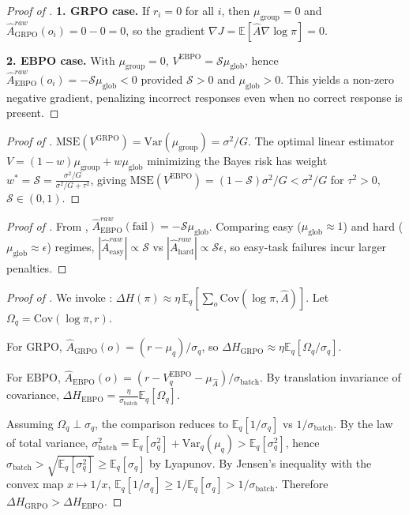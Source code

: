 \documentclass{article}
\theoremstyle{plain}
\theoremstyle{definition}
\theoremstyle{remark}
\begin{document}
\iffalse
\begin{proof}[Proof of ]
\textbf{1. GRPO case.} If $r_i=0$ for all $i$, then $\mu_{\text{group}}=0$ and $\hat{A}^{raw}_{\text{GRPO}}(o_i)=0-0=0$, so the gradient $\nabla J=\mathbb{E}[\hat{A}\nabla\log\pi]=0$.

\textbf{2. EBPO case.} With $\mu_{\text{group}}=0$, $V^{\text{EBPO}}=\mathcal{S}\mu_{\text{glob}}$, hence $\hat{A}^{raw}_{\text{EBPO}}(o_i)=-\mathcal{S}\mu_{\text{glob}}<0$ provided $\mathcal{S}>0$ and $\mu_{\text{glob}}>0$. This yields a non-zero negative gradient, penalizing incorrect responses even when no correct response is present.
\end{proof}

\begin{proof}[Proof of ]
$\text{MSE}(V^{\text{GRPO}})=\text{Var}(\mu_{\text{group}})=\sigma^2/G$. The optimal linear estimator $V=(1-w)\mu_{\text{group}}+w\mu_{\text{glob}}$ minimizing the Bayes risk has weight $w^*=\mathcal{S}=\frac{\sigma^2/G}{\sigma^2/G+\tau^2}$, giving
$\text{MSE}(V^{\text{EBPO}}) = (1-\mathcal{S})\sigma^2/G < \sigma^2/G$ for $\tau^2>0$, $\mathcal{S}\in(0,1)$.
\end{proof}

\begin{proof}[Proof of ]
From , $\hat{A}^{raw}_{\text{EBPO}}(\text{fail})=-\mathcal{S}\mu_{\text{glob}}$. Comparing easy ($\mu_{\text{glob}}\approx 1$) and hard ($\mu_{\text{glob}}\approx \epsilon$) regimes, $|\hat{A}^{raw}_{\text{easy}}|\propto\mathcal{S}$ vs $|\hat{A}^{raw}_{\text{hard}}|\propto\mathcal{S}\epsilon$, so easy-task failures incur larger penalties.
\end{proof}

\begin{proof}[Proof of ]
We invoke \citet{cui2025entropy}: $\Delta H(\pi)\approx\eta\,\mathbb{E}_q[\sum_o\text{Cov}(\log\pi,\hat{A})]$. Let $\Omega_q=\text{Cov}(\log\pi,r)$.

For GRPO, $\hat{A}_{\text{GRPO}}(o)=(r-\mu_q)/\sigma_q$, so $\Delta H_{\text{GRPO}}\approx\eta\mathbb{E}_q[\Omega_q/\sigma_q]$.

For EBPO, $\hat{A}_{\text{EBPO}}(o)=(r-V^{\text{EBPO}}_q-\mu_{\hat{A}})/\sigma_{\text{batch}}$. By translation invariance of covariance, $\Delta H_{\text{EBPO}}=\frac{\eta}{\sigma_{\text{batch}}}\mathbb{E}_q[\Omega_q]$.

Assuming $\Omega_q\perp\sigma_q$, the comparison reduces to $\mathbb{E}_q[1/\sigma_q]$ vs $1/\sigma_{\text{batch}}$. By the law of total variance, $\sigma_{\text{batch}}^2=\mathbb{E}_q[\sigma_q^2]+\text{Var}_q(\mu_q)>\mathbb{E}_q[\sigma_q^2]$, hence $\sigma_{\text{batch}}>\sqrt{\mathbb{E}_q[\sigma_q^2]}\geq\mathbb{E}_q[\sigma_q]$ by Lyapunov. By Jensen's inequality with the convex map $x\mapsto 1/x$, $\mathbb{E}_q[1/\sigma_q]\geq 1/\mathbb{E}_q[\sigma_q]>1/\sigma_{\text{batch}}$. Therefore $\Delta H_{\text{GRPO}}>\Delta H_{\text{EBPO}}$.
\end{proof}
\end{document}
